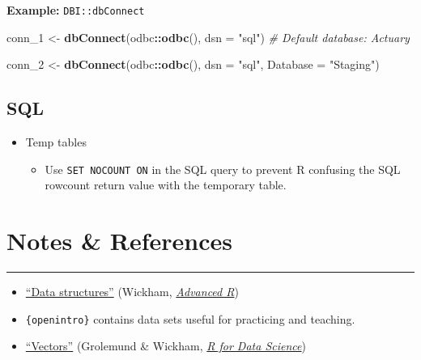\documentclass[
]{book}
\newenvironment{Shaded}{\begin{snugshade}}{\end{snugshade}}
\newcommand{\CommentTok}[1]{\textcolor[rgb]{0.56,0.35,0.01}{\textit{#1}}}
\newcommand{\DataTypeTok}[1]{\textcolor[rgb]{0.13,0.29,0.53}{#1}}
\newcommand{\DecValTok}[1]{\textcolor[rgb]{0.00,0.00,0.81}{#1}}
\newcommand{\KeywordTok}[1]{\textcolor[rgb]{0.13,0.29,0.53}{\textbf{#1}}}
\newcommand{\NormalTok}[1]{#1}
\newcommand{\OperatorTok}[1]{\textcolor[rgb]{0.81,0.36,0.00}{\textbf{#1}}}
\newcommand{\StringTok}[1]{\textcolor[rgb]{0.31,0.60,0.02}{#1}}
\providecommand{\tightlist}{%
  \setlength{\itemsep}{0pt}\setlength{\parskip}{0pt}}
\begin{document}
\textbf{Example:} \texttt{DBI::dbConnect}

\begin{Shaded}
\begin{Highlighting}[]
\NormalTok{conn_}\DecValTok{1}\NormalTok{ <-}\StringTok{ }
\StringTok{  }\KeywordTok{dbConnect}\NormalTok{(odbc}\OperatorTok{::}\KeywordTok{odbc}\NormalTok{(), }\DataTypeTok{dsn =} \StringTok{"sql"}\NormalTok{) }\CommentTok{# Default database: Actuary}

\NormalTok{conn_}\DecValTok{2}\NormalTok{ <-}\StringTok{ }
\StringTok{  }\KeywordTok{dbConnect}\NormalTok{(odbc}\OperatorTok{::}\KeywordTok{odbc}\NormalTok{(), }\DataTypeTok{dsn =} \StringTok{"sql"}\NormalTok{, }\DataTypeTok{Database =} \StringTok{"Staging"}\NormalTok{)}
\end{Highlighting}
\end{Shaded}

\hypertarget{sql}{%
\subsection{SQL}\label{sql}}

\begin{itemize}
\tightlist
\item
  Temp tables

  \begin{itemize}
  \tightlist
  \item
    Use \texttt{SET\ NOCOUNT\ ON} in the SQL query to prevent R confusing the SQL rowcount return value with the temporary table.
  \end{itemize}
\end{itemize}

\hypertarget{notes-references}{%
\section{Notes \& References}\label{notes-references}}

\begin{center}\rule{0.5\linewidth}{0.5pt}\end{center}

\begin{itemize}
\tightlist
\item
  \href{http://adv-r.had.co.nz/Data-structures.html}{``Data structures''} (Wickham, \href{http://adv-r.had.co.nz/}{\emph{Advanced R}})
\item
  \texttt{\{openintro\}} contains data sets useful for practicing and teaching.
\item
  \href{https://r4ds.had.co.nz/vectors.html}{``Vectors''} (Grolemund \& Wickham, \href{https://r4ds.had.co.nz/}{\emph{R for Data Science}})
\end{itemize}
\end{document}
